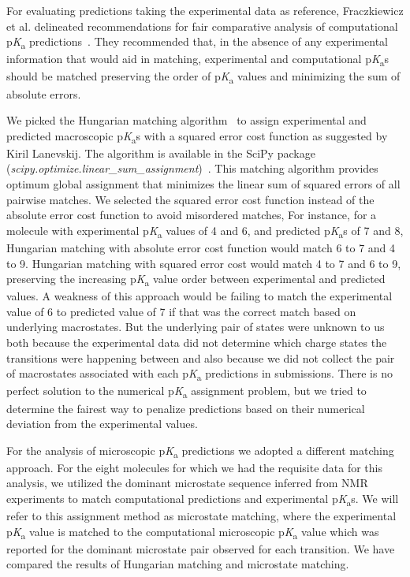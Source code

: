 \documentclass[9pt,lineno,final]{elife}
\newcommand{\pKa}{p\textit{K}\textsubscript{a}}
\begin{document}
For evaluating predictions taking the experimental data as reference, Fraczkiewicz et al. delineated recommendations for fair comparative analysis of computational \pKa{} predictions~\citep{Fraczkiewicz:2013:ReferenceModuleinChemistryMolecularSciencesandChemicalEngineering}. 
They recommended that, in the absence of any experimental information that would aid in matching, experimental and computational \pKa{}s should be matched preserving the order of \pKa{} values and minimizing the sum of absolute errors.

We picked the Hungarian matching algorithm~\citep{Kuhn:1955:Nav.Res.Logist.Q., Munkres:1957:JSIAM} to assign experimental and predicted macroscopic \pKa{}s with a squared error cost function as suggested by Kiril Lanevskij. The algorithm is available in the SciPy package (\textit{scipy.optimize.linear\_sum\_assignment})~\citep{SciPy-linear-sum-assignment}.
This matching algorithm provides optimum global assignment that minimizes the linear sum of squared errors of all pairwise matches.
We selected the squared error cost function instead of the absolute error cost function to avoid misordered matches,
For instance, for a molecule with experimental \pKa{} values of 4 and 6, and predicted \pKa{}s of 7 and 8, Hungarian matching with absolute error cost function would match 6 to 7 and 4 to 9.
Hungarian matching with squared error cost would match 4 to 7 and 6 to 9, preserving the increasing \pKa{} value order between experimental and predicted values.
A weakness of this approach would be failing to match the experimental value of 6 to predicted value of 7 if that was the correct match based on underlying macrostates. But the underlying pair of states were unknown to us both because the experimental data did not determine which charge states the transitions were happening between and also because we did not collect the pair of macrostates associated with each \pKa{} predictions in submissions. 
There is no perfect solution to the numerical \pKa{} assignment problem, but we tried to determine the fairest way to penalize predictions based on their numerical deviation from the experimental values.

For the analysis of microscopic \pKa{} predictions we adopted a different matching approach. 
For the eight molecules for which we had the requisite data for this analysis, we utilized the dominant microstate sequence inferred from NMR experiments to match computational predictions and experimental \pKa{}s. 
We will refer to this assignment method as microstate matching, where the experimental \pKa{} value is matched to the computational microscopic \pKa{} value which was reported for the dominant microstate pair observed for each transition. 
We have compared the results of Hungarian matching and microstate matching. 
\end{document}
